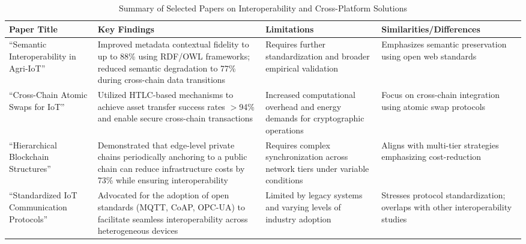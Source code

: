 \documentclass[12pt,onecolumn]{IEEEtran} %
\begin{document}
\begin{table}[h!]
\centering
\caption{Summary of Selected Papers on Interoperability and Cross-Platform Solutions}
\label{tab:interoperability}
\begin{tabularx}{\columnwidth}{@{}lYYY@{}}
\toprule
\textbf{Paper Title} & \textbf{Key Findings} & \textbf{Limitations} & \textbf{Similarities/Differences} \\
\midrule
``Semantic Interoperability in Agri-IoT'' & Improved metadata contextual fidelity to up to 88\% using RDF/OWL frameworks; reduced semantic degradation to 77\% during cross-chain data transitions \cite{irfan2025aniotdrivensmart, huang2025digitaltraceabilityin} & Requires further standardization and broader empirical validation & Emphasizes semantic preservation using open web standards \\
\midrule
``Cross-Chain Atomic Swaps for IoT'' & Utilized HTLC-based mechanisms to achieve asset transfer success rates $>$94\% and enable secure cross-chain transactions \cite{abdurrohim2024blockchainbasedframeworkfor, huang2025digitaltraceabilityin} & Increased computational overhead and energy demands for cryptographic operations & Focus on cross-chain integration using atomic swap protocols \\
\midrule
``Hierarchical Blockchain Structures'' & Demonstrated that edge-level private chains periodically anchoring to a public chain can reduce infrastructure costs by 73\% while ensuring interoperability \cite{huang2025digitaltraceabilityin, irfan2025aniotdrivensmart} & Requires complex synchronization across network tiers under variable conditions & Aligns with multi-tier strategies emphasizing cost-reduction \\
\midrule
``Standardized IoT Communication Protocols'' & Advocated for the adoption of open standards (MQTT, CoAP, OPC-UA) to facilitate seamless interoperability across heterogeneous devices \cite{irfan2025aniotdrivensmart, abdurrohim2024blockchainbasedframeworkfor} & Limited by legacy systems and varying levels of industry adoption & Stresses protocol standardization; overlaps with other interoperability studies \\
\bottomrule
\end{tabularx}
\end{table}
\end{document}
